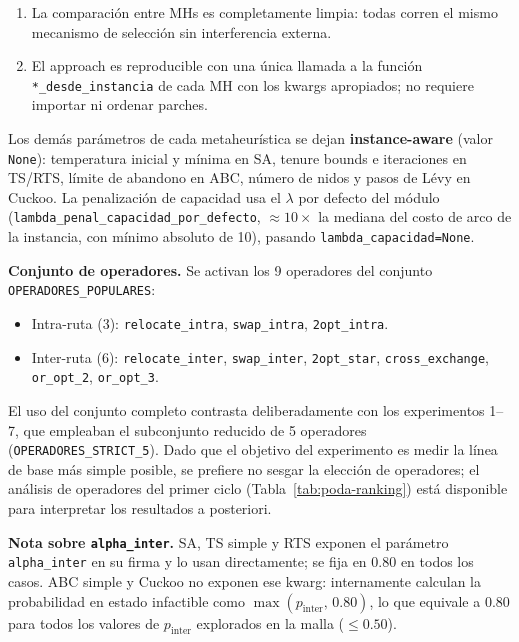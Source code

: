 \begin{enumerate}
\item La comparación entre MHs es completamente limpia: todas corren
  el mismo mecanismo de selección sin interferencia externa.
\item El approach es reproducible con una única llamada a la función
  \texttt{*\_desde\_instancia} de cada MH con los kwargs apropiados;
  no requiere importar ni ordenar parches.
\end{enumerate}

Los demás parámetros de cada metaheurística se dejan
\textbf{instance-aware} (valor \texttt{None}): temperatura inicial y
mínima en SA, tenure bounds e iteraciones en TS/RTS, límite de
abandono en ABC, número de nidos y pasos de Lévy en Cuckoo. La
penalización de capacidad usa el $\lambda$ por defecto del módulo
(\texttt{lambda\_penal\_capacidad\_por\_defecto}, $\approx 10\times$
la mediana del costo de arco de la instancia, con mínimo absoluto
de 10), pasando \texttt{lambda\_capacidad=None}.

\medskip
\noindent\textbf{Conjunto de operadores.} Se activan los 9 operadores
del conjunto \texttt{OPERADORES\_POPULARES}:

\begin{itemize}
\item Intra-ruta (3): \texttt{relocate\_intra}, \texttt{swap\_intra},
  \texttt{2opt\_intra}.
\item Inter-ruta (6): \texttt{relocate\_inter}, \texttt{swap\_inter},
  \texttt{2opt\_star}, \texttt{cross\_exchange}, \texttt{or\_opt\_2},
  \texttt{or\_opt\_3}.
\end{itemize}

El uso del conjunto completo contrasta deliberadamente con los
experimentos 1--7, que empleaban el subconjunto reducido de 5
operadores (\texttt{OPERADORES\_STRICT\_5}). Dado que el objetivo del
experimento es medir la línea de base más simple posible, se prefiere
no sesgar la elección de operadores; el análisis de operadores del
primer ciclo (Tabla~\ref{tab:poda-ranking}) está disponible para
interpretar los resultados a posteriori.

\medskip
\noindent\textbf{Nota sobre \texttt{alpha\_inter}.} SA, TS simple y
RTS exponen el parámetro \texttt{alpha\_inter} en su firma y lo usan
directamente; se fija en $0.80$ en todos los casos. ABC simple y
Cuckoo no exponen ese kwarg: internamente calculan la probabilidad
en estado infactible como $\max(p_{\text{inter}},\,0.80)$, lo que
equivale a $0.80$ para todos los valores de $p_{\text{inter}}$
explorados en la malla ($\le 0.50$).

